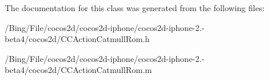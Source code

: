 The documentation for this class was generated from the following files\-:\begin{DoxyCompactItemize}
\item 
/\-Bing/\-File/cocos2d/cocos2d-\/iphone/cocos2d-\/iphone-\/2.-\/beta4/cocos2d/C\-C\-Action\-Catmull\-Rom.\-h\item 
/\-Bing/\-File/cocos2d/cocos2d-\/iphone/cocos2d-\/iphone-\/2.-\/beta4/cocos2d/C\-C\-Action\-Catmull\-Rom.\-m\end{DoxyCompactItemize}

